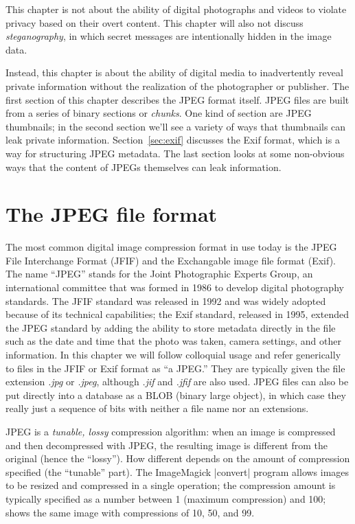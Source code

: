 
This chapter is not about the ability of digital photographs and
videos to violate privacy based on their overt content. This chapter
will also not discuss \emph{steganography}, in which secret messages
are intentionally hidden in the image data.

Instead, this chapter is about the ability of digital media to
inadvertently reveal private information without the realization of
the photographer or publisher.  The first section of this chapter
describes the JPEG format itself. JPEG files are built from a series
of binary sections or \emph{chunks}. One kind of section are JPEG
thumbnails; in the second section we'll see a variety of ways that
thumbnails can leak private information. Section~\ref{sec:exif}
discusses the Exif format, which is a way for structuring JPEG
metadata. The last section looks at some non-obvious ways that the
content of JPEGs themselves can leak information.

\section{The JPEG file format}

The most common digital image compression format in use today is the
JPEG File Interchange Format (JFIF) and the Exchangable image file
format (Exif). The name ``JPEG'' stands for the Joint Photographic Experts
Group, an international committee that was formed in 1986 to develop digital
photography standards.  The JFIF standard was released in 1992 and was
widely adopted because of its technical capabilities; the Exif
standard, released in 1995, extended the JPEG standard by adding the
ability to store metadata directly in the file such as the date and
time that the photo was taken, camera settings, and other
information. In this chapter we will follow colloquial usage and refer
generically to files in the JFIF or Exif format as ``a JPEG.'' They
are typically given the file extension \emph{.jpg} or \emph{.jpeg},
although \emph{.jif} and \emph{.jfif} are also used. JPEG files can
also be put directly into a database as a BLOB (binary large
object), in which case they really just a sequence of bits with neither a file name nor an extensions.

JPEG is a \emph{tunable, lossy} compression algorithm: when an image
is compressed and then decompressed with JPEG, the resulting image is
different from the original (hence the ``lossy''). How different depends on the amount of
compression specified (the ``tunable'' part). The ImageMagick |convert| program allows images
to be resized and compressed in a single operation; the compression
amount is typically specified as a number between 1 (maximum compression) and 100;
 shows the same image with compressions of 10, 50,
and 99.

